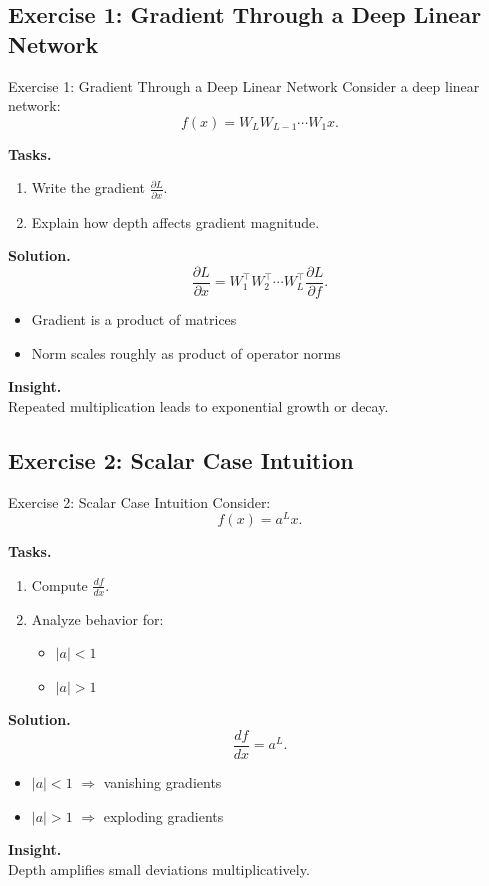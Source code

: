 \documentclass[aspectratio=169,11pt]{beamer}
\begin{document}
\subsection{Exercise 1: Gradient Through a Deep Linear Network}
\begin{frame}[t,allowframebreaks]{Exercise 1: Gradient Through a Deep Linear Network}
\small
Consider a deep linear network:
\[
f(x) = W_L W_{L-1} \cdots W_1 x.
\]

\textbf{Tasks.}\\ \begin{enumerate}
    \item Write the gradient $\frac{\partial L}{\partial x}$.
    \item Explain how depth affects gradient magnitude.
\end{enumerate}

\textbf{Solution.}\\ \[
\frac{\partial L}{\partial x}
= W_1^\top W_2^\top \cdots W_L^\top \frac{\partial L}{\partial f}.
\]

\begin{itemize}
    \item Gradient is a product of matrices
    \item Norm scales roughly as product of operator norms
\end{itemize}

\textbf{Insight.}\\ Repeated multiplication leads to exponential growth or decay.
\end{frame}

\subsection{Exercise 2: Scalar Case Intuition}
\begin{frame}[t,allowframebreaks]{Exercise 2: Scalar Case Intuition}
\small
Consider:
\[
f(x) = a^L x.
\]

\textbf{Tasks.}\\ \begin{enumerate}
    \item Compute $\frac{df}{dx}$.
    \item Analyze behavior for:
    \begin{itemize}
        \item $|a| < 1$
        \item $|a| > 1$
    \end{itemize}
\end{enumerate}

\textbf{Solution.}\\ \[
\frac{df}{dx} = a^L.
\]

\begin{itemize}
    \item $|a| < 1$ $\Rightarrow$ vanishing gradients
    \item $|a| > 1$ $\Rightarrow$ exploding gradients
\end{itemize}

\textbf{Insight.}\\ Depth amplifies small deviations multiplicatively.
\end{frame}
\end{document}
